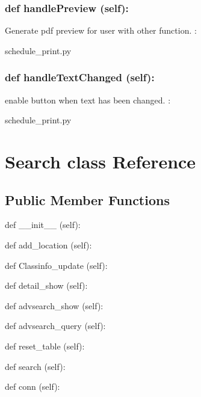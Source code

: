 \hypertarget{class_poly_a14a7ad77ce612b0c54f531d307ee4b39}{
\subsubsection[{def handlePreview (self):}]{\setlength{\rightskip}{0pt plus 5cm}def {handlePreview} (self):}}\label{class_poly_a14a7ad77ce612b0c54f531d307ee4b39}
Generate pdf preview for user with other function.
:\begin{DoxyCompactItemize}
\item 
schedule\_print.\-py\end{DoxyCompactItemize}

\hypertarget{class_poly_a14a7ad77ce612b0c54f531d307ee4b39}{
\subsubsection[{def handleTextChanged (self):}]{\setlength{\rightskip}{0pt plus 5cm}def {handleTextChanged} (self):}}\label{class_poly_a14a7ad77ce612b0c54f531d307ee4b39}
enable button when text has been changed.
:\begin{DoxyCompactItemize}
\item 
schedule\_print.\-py\end{DoxyCompactItemize}


\hypertarget{Search_class}{\section{Search class Reference}
\label{Search_class}
}
\subsection*{Public Member Functions}
\begin{DoxyCompactItemize}
\item 
def {\_\_init\_\_} (self):
\item 
def {add\_location} (self):
\item 
def {Classinfo\_update} (self):
\item 
def {detail\_show} (self):
\item 
def {advsearch\_show} (self):
\item 
def {advsearch\_query} (self):
\item 
def {reset\_table} (self):
\item 
def {search} (self):
\item 
def {conn} (self):
\end{DoxyCompactItemize}

